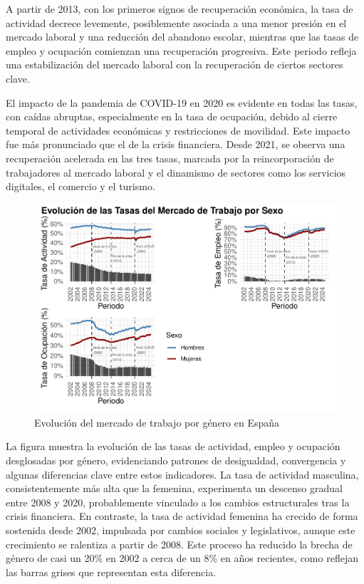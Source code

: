 \documentclass[Universitat de
València,article,submit,moreauthors,pdftex]{Definitions/mdpi}
\begin{document}
A partir de 2013, con los primeros signos de recuperación económica, la
tasa de actividad decrece levemente, posiblemente asociada a una menor
presión en el mercado laboral y una reducción del abandono escolar,
mientras que las tasas de empleo y ocupación comienzan una recuperación
progresiva. Este periodo refleja una estabilización del mercado laboral
con la recuperación de ciertos sectores clave.

El impacto de la pandemia de COVID-19 en 2020 es evidente en todas las
tasas, con caídas abruptas, especialmente en la tasa de ocupación,
debido al cierre temporal de actividades económicas y restricciones de
movilidad. Este impacto fue más pronunciado que el de la crisis
financiera. Desde 2021, se observa una recuperación acelerada en las
tres tasas, marcada por la reincorporación de trabajadores al mercado
laboral y el dinamismo de sectores como los servicios digitales, el
comercio y el turismo.

\begin{figure}[h]

{\centering \includegraphics[width=1\linewidth]{ProyectoAED2024_files/figure-latex/unnamed-chunk-28-1} 

}

\caption{Evolución del mercado de trabajo por género en España}\label{fig:unnamed-chunk-28}
\end{figure}

La figura muestra la evolución de las tasas de actividad, empleo y
ocupación desglosadas por género, evidenciando patrones de desigualdad,
convergencia y algunas diferencias clave entre estos indicadores. La
tasa de actividad masculina, consistentemente más alta que la femenina,
experimenta un descenso gradual entre 2008 y 2020, probablemente
vinculado a los cambios estructurales tras la crisis financiera. En
contraste, la tasa de actividad femenina ha crecido de forma sostenida
desde 2002, impulsada por cambios sociales y legislativos, aunque este
crecimiento se ralentiza a partir de 2008. Este proceso ha reducido la
brecha de género de casi un 20\% en 2002 a cerca de un 8\% en años
recientes, como reflejan las barras grises que representan esta
diferencia.
\end{document}

